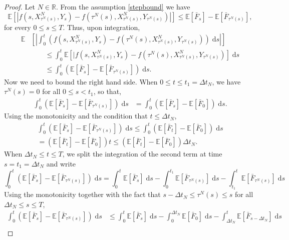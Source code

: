 \documentclass[reqno,12pt]{amsart}
\theoremstyle{plain}%
\theoremstyle{definition}
\begin{document}
\begin{proof}
    Let $N\in \mathbb{R}$. From the assumption \eqref{stepbound} we have
    \[
        \mathbb{E}\left[|f(s, X_{\tau^N(s)}^N, Y_s) - f(\tau^N(s), X_{\tau^N(s)}^N, Y_{\tau^N(s)})|\right] \leq \mathbb{E}[\bar F_s] - \mathbb{E}[\bar F_{\tau^N(s)}],
    \]
    for every $0\leq s \leq T$. Thus, upon integration,
    \begin{align*}
        \mathbb{E}&\left[\left|\int_0^t \left( f(s, X_{\tau^N(s)}^N, Y_s) - f(\tau^N(s), X_{\tau^N(s)}^N, Y_{\tau^N(s)}) \right)\;\mathrm{d}s\right|\right] \\
        & \qquad \leq \int_0^t \mathbb{E}\left[|f(s, X_{\tau^N(s)}^N, Y_s) - f(\tau^N(s), X_{\tau^N(s)}^N, Y_{\tau^N(s)}) \right]\;\mathrm{d}s \\
        & \qquad \leq \int_0^t \left(\mathbb{E}[\bar F_s] - \mathbb{E}[\bar F_{\tau^N(s)}]\right)\;\mathrm{d}s.
    \end{align*}
    Now we need to bound the right hand side. When $0 \leq t\leq t_1 = \Delta t_N$, we have $\tau^N(s) = 0$ for all $0 \leq s < t_1$, so that,
    \begin{align*}
      \int_0^t (\mathbb{E}[\bar F_s] - \mathbb{E}[\bar F_{\tau^N(s)}])\;\mathrm{d}s & = \int_0^t (\mathbb{E}[\bar F_s] - \mathbb{E}[\bar F_{0}]) \;\mathrm{d}s.
    \end{align*}
    Using the monotonicity and the condition that $t \leq \Delta t_N$,
    \begin{multline*}
      \int_0^t (\mathbb{E}[\bar F_s] - \mathbb{E}[\bar F_{\tau^N(s)}])\;\mathrm{d}s \leq \int_0^t (\mathbb{E}[\bar F_t] - \mathbb{E}[\bar F_0]) \;\mathrm{d}s  \\
      = (\mathbb{E}[\bar F_t] - \mathbb{E}[\bar F_0])t \leq (\mathbb{E}[\bar F_t] - \mathbb{E}[\bar F_0])\Delta t_N.
    \end{multline*}
    When $\Delta t_N\leq t \leq T$, we split the integration of the second term at time $s = t_1 = \Delta t_N$ and write
    \[ 
      \int_0^t (\mathbb{E}[\bar F_s] - \mathbb{E}[\bar F_{\tau^N(s)}])\;\mathrm{d}s = \int_0^t \mathbb{E}[\bar F_s] \;\mathrm{d}s - \int_0^{t_1} \mathbb{E}[\bar F_{\tau^N(s)}]\;\mathrm{d}s - \int_{t_1}^t \mathbb{E}[\bar F_{\tau^N(s)}]\;\mathrm{d}s
    \]
    Using the monotonicity together with the fact that $s - \Delta t_N\leq \tau^N(s) \leq s$ for all $\Delta t_N\leq s \leq T$,
    \begin{align*}
        \int_0^t (\mathbb{E}[\bar F_s] - \mathbb{E}[\bar F_{\tau^N(s)}])\;\mathrm{d}s & \leq \int_0^t \mathbb{E}[\bar F_s] \;\mathrm{d}s - \int_0^{\Delta t_N} \mathbb{E}[\bar F_0]\;\mathrm{d}s - \int_{\Delta t_N}^t \mathbb{E}[\bar F_{s-\Delta t_N}]\;\mathrm{d}s \\

\end{align*}
\end{proof}
\end{document}
